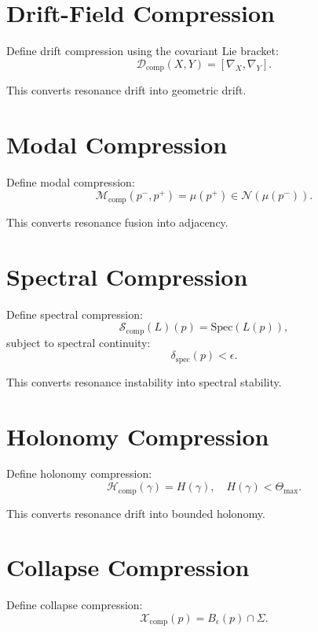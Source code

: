 \documentclass[11pt]{article}
\begin{document}
\section{Drift-Field Compression}

Define drift compression using the covariant Lie bracket:
\[
\mathcal{D}_{\mathrm{comp}}(X,Y)
  = [\nabla_X,\nabla_Y].
\]

This converts resonance drift into geometric drift.

\section{Modal Compression}

Define modal compression:
\[
\mathcal{M}_{\mathrm{comp}}(p^-,p^+)
  = \mu(p^+) \in \mathcal{N}(\mu(p^-)).
\]

This converts resonance fusion into adjacency.

\section{Spectral Compression}

Define spectral compression:
\[
\mathcal{S}_{\mathrm{comp}}(L)(p)
  = \mathrm{Spec}(L(p)),
\]
subject to spectral continuity:
\[
\delta_{\mathrm{spec}}(p) < \epsilon.
\]

This converts resonance instability into spectral stability.

\section{Holonomy Compression}

Define holonomy compression:
\[
\mathcal{H}_{\mathrm{comp}}(\gamma)
  = H(\gamma),
\quad H(\gamma) < \Theta_{\max}.
\]

This converts resonance drift into bounded holonomy.

\section{Collapse Compression}

Define collapse compression:
\[
\mathcal{X}_{\mathrm{comp}}(p)
  = B_\epsilon(p) \cap \Sigma.
\]
\end{document}
